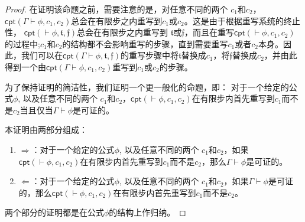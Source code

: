 \begin{proof}
	
	在证明该命题之前，需要注意的是，对任意不同的两个\CPT{} $c_1$和$c_2$，$\textsf{cpt}(\Gamma \vdash\phi, c_1, c_2)$总会在有限步之内重写到$c_1$或$c_2$。这是由于根据\CPT{}重写系统的终止性，
	$\textsf{cpt}(\vdash\phi, \mathfrak{t}, \mathfrak{f})$总会在有限步之内重写到 $\mathfrak{t}$或$\mathfrak{f}$，而且在重写$\textsf{cpt}(\vdash\phi, c_1, c_2)$的过程中;$c_1$和$c_2$的结构都不会影响重写的步骤，直到需要重写$c_1$或者$c_2$本身。因此，我们可以在$\textsf{cpt}(\Gamma \vdash\phi, \mathfrak{t}, \mathfrak{f})$的重写步骤中将$\mathfrak{t}$替换成$c_1$，将$\mathfrak{f}$替换成$c_2$，并由此得到一个由$\textsf{cpt}(\Gamma \vdash\phi, c_1, c_2)$重写到$c_1$或$c_2$的步骤。
	
	为了保持证明的简洁性，我们证明一个更一般化的命题，即：
	对于一个给定的公式$\phi$, 以及任意不同的两个\CPT{} $c_1$和$c_2$，$\textsf{cpt}(\vdash\phi, c_1, c_2)$在有限步内首先重写到$c_1$而不是$c_2$当且仅当$\Gamma \vdash \phi$是可证的。 
	
	本证明由两部分组成：
	\begin{enumerate}
		\item $\Rightarrow$：对于一个给定的公式$\phi$, 以及任意不同的两个\CPT{} $c_1$和$c_2$，如果$\textsf{cpt}(\vdash\phi, c_1, c_2)$在有限步内首先重写到$c_1$而不是$c_2$，那么$\Gamma \vdash \phi$是可证的。
		\item $\Leftarrow$：对于一个给定的公式$\phi$, 以及任意不同的两个\CPT{} $c_1$和$c_2$，如果$\Gamma \vdash \phi$是可证的，那么$\textsf{cpt}(\vdash\phi, c_1, c_2)$在有限步内首先重写到$c_1$而不是$c_2$。
	\end{enumerate}
	
	两个部分的证明都是在公式$\phi$的结构上作归纳。
	

\end{proof}
